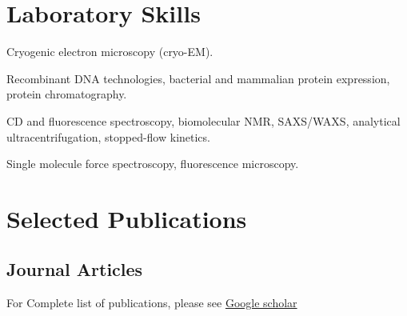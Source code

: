 \documentclass[12pt,letterpaper]{report}
\newcommand{\listitemspace}{0.25em}
\renewenvironment{itemize}
{\begin{list}{}{\setlength{\leftmargin}{0em}
                \setlength{\parskip}{0em}
                \setlength{\itemsep}{\listitemspace}
                \setlength{\parsep}{\listitemspace}}}
{\end{list}}
\begin{document}
    \section*{Laboratory Skills}
    \begin{itemize}
        \item \textbullet \hspace{0.2cm} Cryogenic electron microscopy (cryo-EM).
        \item \textbullet \hspace{0.2cm} Recombinant DNA technologies, bacterial and mammalian protein expression, protein chromatography.
        \item \textbullet \hspace{0.2cm} CD and fluorescence spectroscopy, biomolecular NMR, SAXS/WAXS, analytical ultracentrifugation, stopped-flow kinetics.
        \item \textbullet \hspace{0.2cm} Single molecule force spectroscopy, fluorescence microscopy.
    \end{itemize}

    \section*{Selected Publications}

    \subsection*{Journal Articles}
    For Complete list of publications, please see \href{https://scholar.google.com/citations?user=K91MviEAAAAJ&hl=en}{Google scholar}\\
\end{document}
